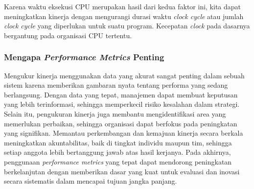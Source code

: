 \documentclass[12pt]{article}
\begin{document}
\hspace*{1cm} Karena waktu eksekusi CPU merupakan hasil dari kedua faktor ini, kita dapat meningkatkan kinerja dengan mengurangi durasi waktu \textit{clock cycle} atau jumlah \textit{clock cycle} yang diperlukan untuk suatu program. Kecepatan \textit{clock} pada dasarnya bergantung pada organisasi CPU tertentu.

\subsubsection{Mengapa \textit{Performance Metrics} Penting}
\hspace*{1cm} Mengukur kinerja menggunakan data yang akurat sangat penting dalam sebuah sistem karena memberikan gambaran nyata tentang performa yang sedang berlangsung. Dengan data yang tepat, manajemen dapat membuat keputusan yang lebih terinformasi, sehingga memperkecil risiko kesalahan dalam strategi. Selain itu, pengukuran kinerja juga membantu mengidentifikasi area yang memerlukan perbaikan, sehingga organisasi dapat berfokus pada peningkatan yang signifikan. Memantau perkembangan dan kemajuan kinerja secara berkala meningkatkan akuntabilitas, baik di tingkat individu maupun tim, sehingga setiap anggota lebih bertanggung jawab atas hasil kerjanya. Pada akhirnya, penggunaan \textit{performance metrics} yang tepat dapat mendorong peningkatan berkelanjutan dengan memberikan dasar yang kuat untuk evaluasi dan inovasi secara sistematis dalam mencapai tujuan jangka panjang.
\end{document}
